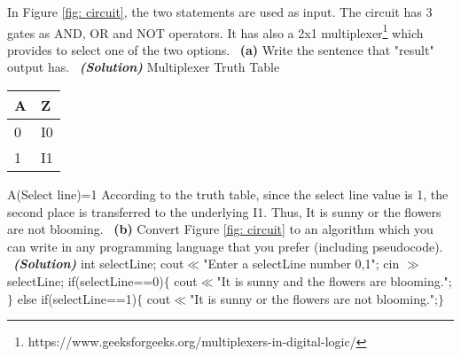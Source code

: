 \documentclass[a4 paper]{article}
\numberwithin{equation}{section}
\newcommand{\subproblem}[1]{~\newline\textbf{(#1)}}
\newcommand{\solution}{~\newline\textbf{\textit{(Solution)}} }
\newcommand{\0}{\mathbf{0}}
\begin{document}
In Figure \ref{fig: circuit}, the two statements are used as input. The circuit has 3 gates as AND, OR and NOT operators. It has also a 2x1 multiplexer\footnote{https://www.geeksforgeeks.org/multiplexers-in-digital-logic/} which provides to select one of the two options. 
\subproblem{a} Write the sentence that "result" output has.
\solution
\newline Multiplexer Truth Table\begin{table}[h!]
\begin{tabular}{|l|l|}
\hline
A & Z  \\ \hline
0 & I0 \\ \hline
1 & I1 \\ \hline
\end{tabular}
\end{table}
\newline \tab\space\space\space\space\space   A(Select line)=1
\newline According to the truth table, since the select line value is 1, the second place is transferred to the underlying I1.  
\newline Thus, It is sunny or the flowers are not blooming.
\newline
\subproblem{b} Convert Figure \ref{fig: circuit} to an algorithm which you can write in any programming language that you prefer (including pseudocode).
\solution
  \newline int selectLine;
  \newline  cout$\ll$"Enter a selectLine number {0,1}"\llendl;
  \newline  cin $\gg$ selectLine;
  \newline  if(selectLine==0)$\{$
   \newline  cout$\ll$"It is sunny and the flowers are blooming."; $\}$
   \newline else if(selectLine==1)$\{$
     \newline    cout$\ll$"It is sunny or the flowers are not blooming.";$\}$
\end{document}
